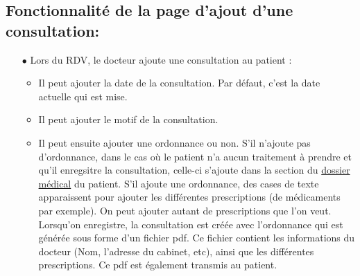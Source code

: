 \documentclass[a4paper]{report}
\begin{document}
\subsection{{Fonctionnalité de la page d'ajout d'une consultation}:}\label{consultation}
\begin{itemize}
    \item[$\bullet$] Lors du RDV, le docteur ajoute une consultation au patient :
    \begin{itemize}
        \item Il peut ajouter la date de la consultation. Par défaut, c'est la date actuelle qui est mise.
        \item Il peut ajouter le motif de la consultation.
        \item Il peut ensuite ajouter une ordonnance ou non. S'il n'ajoute pas d'ordonnance, dans le cas où le patient n'a aucun traitement à prendre et qu'il enregsitre la consultation,
        celle-ci s'ajoute dans la section du {\hyperref[dossier médical]{dossier médical}} du patient. S'il ajoute une ordonnance, des cases de texte apparaissent pour ajouter les différentes
        prescriptions (de médicaments par exemple). On peut ajouter autant de prescriptions que l'on veut. Lorsqu'on enregistre, la consultation est créée avec l'ordonnance qui est générée sous forme d'un fichier pdf.
        Ce fichier contient les informations du docteur (Nom, l'adresse du cabinet, etc), ainsi que les différentes prescriptions. Ce pdf est également transmis au patient.
    \end{itemize}
\end{itemize}
\vspace{3mm}
    
\end{document}
